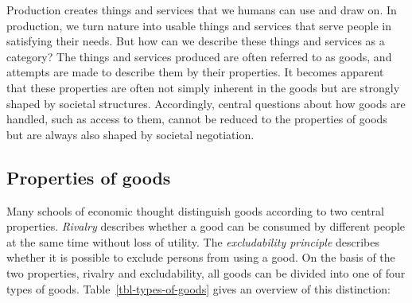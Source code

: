 \documentclass[
  british,
  a4paper,
  DIV=11,
  numbers=noendperiod,
  oneside,
  openany]{scrreprt}
\begin{document}
Production creates things and services that we humans can use and draw
on. In production, we turn nature into usable things and services that
serve people in satisfying their needs. But how can we describe these
things and services as a category? The things and services produced are
often referred to as goods, and attempts are made to describe them by
their properties. It becomes apparent that these properties are often
not simply inherent in the goods but are strongly shaped by societal
structures. Accordingly, central questions about how goods are handled,
such as access to them, cannot be reduced to the properties of goods but
are always also shaped by societal negotiation.

\subsection{Properties of goods}\label{properties-of-goods}

Many schools of economic thought distinguish goods according to two
central properties. \emph{Rivalry} describes whether a good can be
consumed by different people at the same time without loss of utility.
The \emph{excludability principle} describes whether it is possible to
exclude persons from using a good. On the basis of the two properties,
rivalry and excludability, all goods can be divided into one of four
types of goods. Table~\ref{tbl-types-of-goods} gives an overview of this
distinction:

\begin{table}

\caption{\label{tbl-types-of-goods}Types of goods by excludability and
rivalry in consumption.}


\end{table}%
\end{document}
